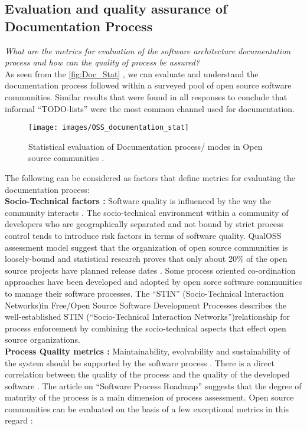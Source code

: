 \subsection{Evaluation and quality assurance of Documentation Process}
\indent \emph{What are the metrics for evaluation of the software architecture documentation process and how can the quality of process be assured?}
\\\indent As seen from the \autoref{fig:Doc_Stat} \cite{Zhao2003}, we can evaluate and understand the documentation process followed within a surveyed pool of open source software communities. Similar results that were found in all responses to conclude that informal \enquote{TODO-lists} were the most common channel used for documentation.
\begin{figure}[H] 
  \centering
  \texttt{[image: images/OSS\_documentation\_stat]}
  \caption[Statistical evaluation of Documentation process/ modes in Open source communities]{Statistical evaluation of Documentation process/ modes in Open source communities \cite{Zhao2003}.}\label{fig:Doc_Stat}
\end{figure}
\indent The following can be considered as factors that define metrics for evaluating the documentation process:
\\\indent \textbf{Socio-Technical factors : } Software quality is influenced by the way the community interacts \cite{Mens2011}. The socio-technical environment within a community of developers who are geographically separated and not bound by strict process control tends to introduce risk factors in terms of software quality. QualOSS assessment model \cite{5314237} suggest that the organization of open source communities is loosely-bound and statistical research \cite{Zhao2003} proves that only about 20\% of the open source projects have planned release dates . Some process oriented co-ordination approaches have been developed and adopted by open sorce software communities to manage their software processes. The \enquote{STIN} (Socio-Technical Interaction Networks)in Free/Open Source Software Development Processes \cite{SPM_2005} describes the well-established STIN (\enquote{Socio-Technical Interaction Networks})relationship for process enforcement by combining the socio-technical aspects that effect open source organizations. 
\\\indent \textbf{Process Quality metrics : } Maintainability, evolvability and sustainability of the system should be supported by the software process \cite{BachmannDocumentingSoftware2010} \cite{5314237}. There is a direct correlation between the quality of the process and the quality of the developed software \cite{Fuggeffa1988}. The article on \enquote{Software Process Roadmap} \cite{Fuggeffa1988} suggests that the degree of maturity of the process is a main dimension of process assessment. Open source communities can be evaluated on the basis of a few exceptional metrics in this regard \cite{Zhao2003} :
